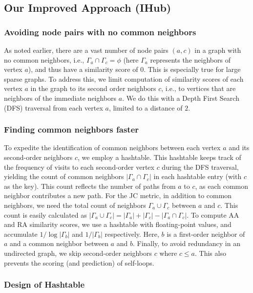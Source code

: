 \subsection{Our Improved Approach (IHub)}

\subsubsection{Avoiding node pairs with no common neighbors}

As noted earlier, there are a vast number of node pairs $(a, c)$ in a graph with no common neighbors, i.e., $\Gamma_a \cap \Gamma_c = \phi$ (here $\Gamma_a$ represents the neighbors of vertex $a$), and thus have a similarity score of $0$. This is especially true for large sparse graphs. To address this, we limit computation of similarity scores of each vertex $a$ in the graph to its second order neighbors $c$, i.e., to vertices that are neighbors of the immediate neighbors $a$. We do this with a Depth First Search (DFS) traversal from each vertex $a$, limited to a distance of $2$.


\subsubsection{Finding common neighbors faster}

To expedite the identification of common neighbors between each vertex $a$ and its second-order neighbors $c$, we employ a hashtable. This hashtable keeps track of the frequency of visits to each second-order vertex $c$ during the DFS traversal, yielding the count of common neighbors $|\Gamma_a \cap \Gamma_c|$ in each hashtable entry (with $c$ as the key). This count reflects the number of paths from $a$ to $c$, as each common neighbor contributes a new path. For the JC metric, in addition to common neighbors, we need the total count of neighbors $\Gamma_a \cup \Gamma_c$ between $a$ and $c$. This count is easily calculated as $|\Gamma_a \cup \Gamma_c| = |\Gamma_a| + |\Gamma_c| - |\Gamma_a \cap \Gamma_c|$. To compute AA and RA similarity scores, we use a hashtable with floating-point values, and accumulate $1/\log{|\Gamma_b|}$ and $1/|\Gamma_b|$ respectively. Here, $b$ is a first-order neighbor of $a$ and a common neighbor between $a$ and $b$. Finally, to avoid redundancy in an undirected graph, we skip second-order neighbors $c$ where $c \leq a$. This also prevents the scoring (and prediction) of self-loops.


\subsubsection{Design of Hashtable}

